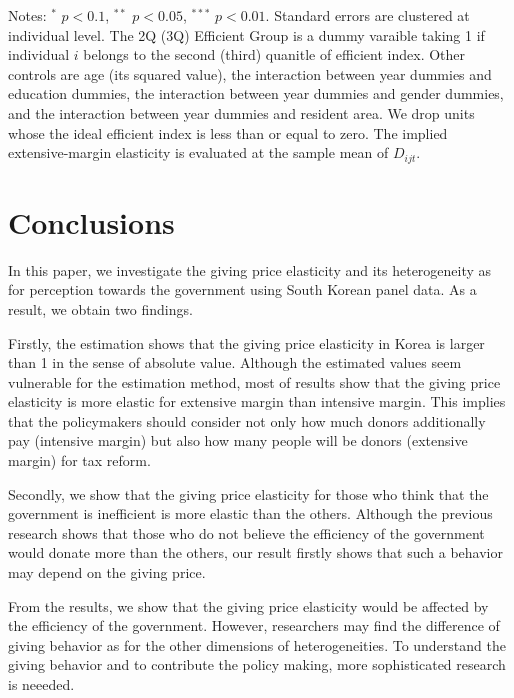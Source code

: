 \documentclass[ review  , 3p ]{elsarticle}
\begin{document}
\begin{table}
\begin{threeparttable}
  \begin{tablenotes}
  \item Notes: $^{*}$ $p < 0.1$, $^{**}$ $p < 0.05$, $^{***}$ $p < 0.01$. Standard errors are clustered at individual level. The 2Q (3Q) Efficient Group is a dummy varaible taking 1 if individual $i$ belongs to the second (third) quanitle of efficient index. Other controls are age (its squared value), the interaction between year dummies and education dummies, the interaction between year dummies and gender dummies, and the interaction between year dummies and resident area. We drop units whose the ideal efficient index is less than or equal to zero. The implied extensive-margin elasticity is evaluated at the sample mean of $D_{ijt}$.
  \end{tablenotes}
  \end{threeparttable}
  \end{table}

  \hypertarget{conclusions}{%
  \section{Conclusions}\label{conclusions}}

  In this paper, we investigate the giving price elasticity and its heterogeneity as for perception towards the government using South Korean panel data. As a result, we obtain two findings.

  Firstly, the estimation shows that the giving price elasticity in Korea is larger than 1 in the sense of absolute value. Although the estimated values seem vulnerable for the estimation method, most of results show that the giving price elasticity is more elastic for extensive margin than intensive margin. This implies that the policymakers should consider not only how much donors additionally pay (intensive margin) but also how many people will be donors (extensive margin) for tax reform.

  Secondly, we show that the giving price elasticity for those who think that the government is inefficient is more elastic than the others. Although the previous research shows that those who do not believe the efficiency of the government would donate more than the others, our result firstly shows that such a behavior may depend on the giving price.

  From the results, we show that the giving price elasticity would be affected by the efficiency of the government. However, researchers may find the difference of giving behavior as for the other dimensions of heterogeneities. To understand the giving behavior and to contribute the policy making, more sophisticated research is neeeded.
\end{document}
